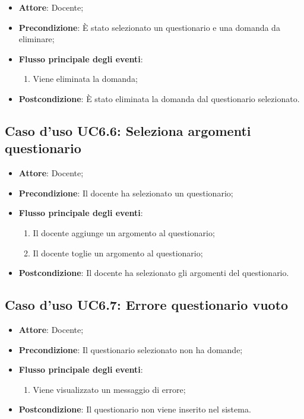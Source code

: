 \documentclass[12pt,a4paper]{article}
\begin{document}
\begin{itemize}

\item \textbf{Attore}: Docente; 
\item \textbf{Precondizione}: È stato selezionato un questionario e una domanda da eliminare;

\item \textbf{Flusso principale degli eventi}:
\begin{enumerate}
	\item Viene eliminata la domanda;
	
\end{enumerate}
\item \textbf{Postcondizione}: È stato eliminata la domanda dal questionario selezionato.
\end{itemize}
\hypertarget{UC6.6}{}
\subsection{Caso d'uso UC6.6: Seleziona argomenti questionario}

\begin{itemize}

\item \textbf{Attore}: Docente; 
\item \textbf{Precondizione}: Il docente ha selezionato un questionario;

\item \textbf{Flusso principale degli eventi}:
\begin{enumerate}
	\item Il docente aggiunge un argomento al questionario;
	\item Il docente toglie un argomento al questionario;
	
\end{enumerate}
\item \textbf{Postcondizione}: Il docente ha selezionato gli argomenti del questionario.
\end{itemize}
\hypertarget{UC6.7}{}
\subsection{Caso d'uso UC6.7: Errore questionario vuoto}

\begin{itemize}

\item \textbf{Attore}: Docente; 
\item \textbf{Precondizione}: Il questionario selezionato non ha domande;

\item \textbf{Flusso principale degli eventi}:
\begin{enumerate}
	\item Viene visualizzato un messaggio di errore;
	
\end{enumerate}
\item \textbf{Postcondizione}: Il questionario non viene inserito nel sistema.
\end{itemize}
\hypertarget{UC7}{}
\end{document}
